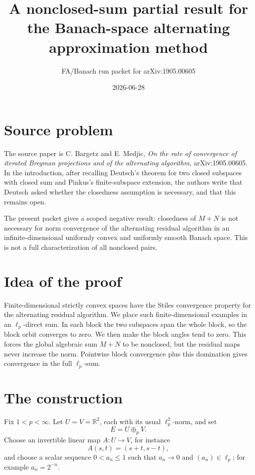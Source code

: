 \documentclass[11pt]{article}
\title{A nonclosed-sum partial result for the Banach-space alternating approximation method}
\author{FA/Banach run packet for arXiv:1905.00605}
\date{2026-06-28}
\begin{document}
\maketitle

\section*{Source problem}

The source paper is C. Bargetz and E. Medjic, \emph{On the rate of convergence of iterated Bregman projections and of the alternating algorithm}, arXiv:1905.00605.  In the introduction, after recalling Deutsch's theorem for two closed subspaces with closed sum and Pinkus's finite-subspace extension, the authors write that Deutsch asked whether the closedness assumption is necessary, and that this remains open.

The present packet gives a scoped negative result: closedness of \(M+N\) is not necessary for norm convergence of the alternating residual algorithm in an infinite-dimensional uniformly convex and uniformly smooth Banach space.  This is not a full characterization of all nonclosed pairs.

\section*{Idea of the proof}

Finite-dimensional strictly convex spaces have the Stiles convergence property for the alternating residual algorithm.  We place such finite-dimensional examples in an \(\ell_p\)-direct sum.  In each block the two subspaces span the whole block, so the block orbit converges to zero.  We then make the block angles tend to zero.  This forces the global algebraic sum \(M+N\) to be nonclosed, but the residual maps never increase the norm.  Pointwise block convergence plus this domination gives convergence in the full \(\ell_p\)-sum.

\section*{The construction}

Fix \(1<p<\infty\).  Let \(U=V=\mathbb R^2\), each with its usual \(\ell_p^2\)-norm, and set
\[
  E=U\oplus_p V.
\]
Choose an invertible linear map \(A:U\to V\), for instance
\[
  A(s,t)=(s+t,s-t),
\]
and choose a scalar sequence \(0<a_n\leq 1\) such that \(a_n\to0\) and \((a_n)\in\ell_p\); for example \(a_n=2^{-n}\).
\end{document}
